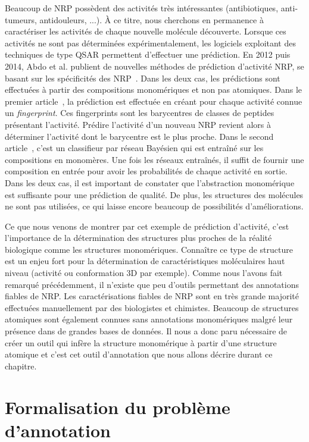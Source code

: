Beaucoup de NRP possèdent des activités très intéressantes (antibiotiques, anti-tumeurs, antidouleurs, ...).
À ce titre, nous cherchons en permanence à caractériser les activités de chaque nouvelle molécule découverte.
Lorsque ces activités ne sont pas déterminées expérimentalement, les logiciels exploitant des techniques de type QSAR permettent d'effectuer une prédiction.
En 2012 puis 2014, Abdo et al. publient de nouvelles méthodes de prédiction d'activité NRP, se basant sur les spécificités des NRP~\cite{abdo_new_2012, abdo_prediction_2014}.
Dans les deux cas, les prédictions sont effectuées à partir des compositions monomériques et non pas atomiques.
Dans le premier article~\cite{abdo_new_2012}, la prédiction est effectuée en créant pour chaque activité connue un \textit{fingerprint}.
Ces fingerprints sont les barycentres de classes de peptides présentant l'activité.
Prédire l'activité d'un nouveau NRP revient alors à déterminer l'activité dont le barycentre est le plus proche.
Dans le second article~\cite{abdo_prediction_2014}, c'est un classifieur par réseau Bayésien qui est entraîné sur les compositions en monomères.
Une fois les réseaux entraînés, il suffit de fournir une composition en entrée pour avoir les probabilités de chaque activité en sortie.
Dans les deux cas, il est important de constater que l'abstraction monomérique est suffisante pour une prédiction de qualité.
De plus, les structures des molécules ne sont pas utilisées, ce qui laisse encore beaucoup de possibilités d'améliorations.

Ce que nous venons de montrer par cet exemple de prédiction d'activité, c'est l'importance de la détermination des structures plus proches de la réalité biologique comme les structures monomériques.
Connaître ce type de structure est un enjeu fort pour la détermination de caractéristiques moléculaires haut niveau (activité ou conformation 3D par exemple).
Comme nous l'avons fait remarqué précédemment, il n'existe que peu d'outils permettant des annotations fiables de NRP.
Les caractérisations fiables de NRP sont en très grande majorité effectuées manuellement par des biologistes et chimistes.
Beaucoup de structures atomiques sont également connues sans annotations monomériques malgré leur présence dans de grandes bases de données.
Il nous a donc paru nécessaire de créer un outil qui infère la structure monomérique à partir d'une structure atomique et c'est cet outil d'annotation que nous allons décrire durant ce chapitre.




\section{Formalisation du problème d'annotation}

